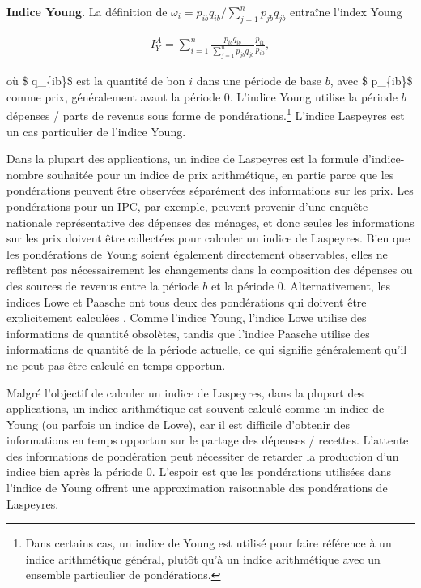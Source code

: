\documentclass[]{article}
\begin{document}
\textbf{Indice Young}. La définition de \(\omega_{i} = p_{ib} q_{ib} / \sum_{j = 1}^{n} p_{jb} q_{jb}\) entraîne l'index Young

\begin{align*}
I^{A}_{Y} = \sum_{i = 1}^{n} \frac{p_{ib} q_{ib}}{\sum_{j = 1}^{n} p_{jb} q_{jb}} \frac{p_{i1}}{p_{i0}},
\end{align*}

où \$ q\_\{ib\}\$ est la quantité de bon \(i\) dans une période de base \(b\), avec \$ p\_\{ib\}\$ comme prix, généralement avant la période 0. L'indice Young utilise la période \(b\) dépenses / parts de revenus sous forme de pondérations.\footnote{Dans certains cas, un indice de Young est utilisé pour faire référence à un indice arithmétique général, plutôt qu'à un indice arithmétique avec un ensemble particulier de pondérations.} L'indice Laspeyres est un cas particulier de l'indice Young.

Dans la plupart des applications, un indice de Laspeyres est la formule d'indice-nombre souhaitée pour un indice de prix arithmétique, en partie parce que les pondérations peuvent être observées séparément des informations sur les prix. Les pondérations pour un IPC, par exemple, peuvent provenir d'une enquête nationale représentative des dépenses des ménages, et donc seules les informations sur les prix doivent être collectées pour calculer un indice de Laspeyres. Bien que les pondérations de Young soient également directement observables, elles ne reflètent pas nécessairement les changements dans la composition des dépenses ou des sources de revenus entre la période \(b\) et la période 0. Alternativement, les indices Lowe et Paasche ont tous deux des pondérations qui doivent être explicitement calculées . Comme l'indice Young, l'indice Lowe utilise des informations de quantité obsolètes, tandis que l'indice Paasche utilise des informations de quantité de la période actuelle, ce qui signifie généralement qu'il ne peut pas être calculé en temps opportun.

Malgré l'objectif de calculer un indice de Laspeyres, dans la plupart des applications, un indice arithmétique est souvent calculé comme un indice de Young (ou parfois un indice de Lowe), car il est difficile d'obtenir des informations en temps opportun sur le partage des dépenses / recettes. L'attente des informations de pondération peut nécessiter de retarder la production d'un indice bien après la période 0. L'espoir est que les pondérations utilisées dans l'indice de Young offrent une approximation raisonnable des pondérations de Laspeyres.
\end{document}
